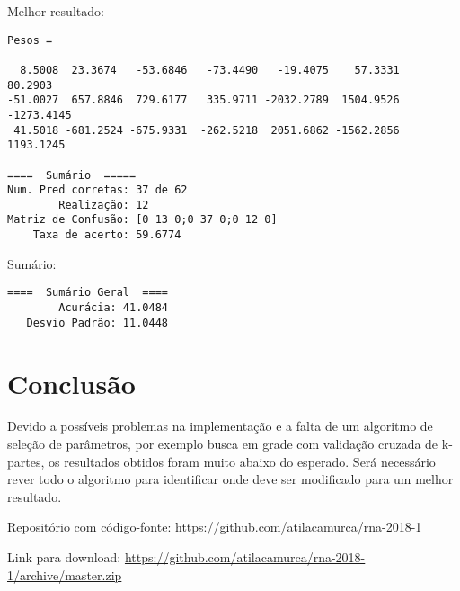 Melhor resultado:

\begin{verbatim}
Pesos =

  8.5008  23.3674   -53.6846   -73.4490   -19.4075    57.3331    80.2903
-51.0027  657.8846  729.6177   335.9711 -2032.2789  1504.9526 -1273.4145
 41.5018 -681.2524 -675.9331  -262.5218  2051.6862 -1562.2856  1193.1245

====  Sumário  =====
Num. Pred corretas: 37 de 62
        Realização: 12
Matriz de Confusão: [0 13 0;0 37 0;0 12 0]
    Taxa de acerto: 59.6774
\end{verbatim}

Sumário:

\begin{verbatim}
====  Sumário Geral  ====
        Acurácia: 41.0484
   Desvio Padrão: 11.0448
\end{verbatim}

\section{Conclusão}

Devido a possíveis problemas na implementação e a falta de um algoritmo
de seleção de parâmetros, por exemplo busca em grade com validação
cruzada de k-partes, os resultados obtidos foram muito abaixo do
esperado. Será necessário rever todo o algoritmo para identificar onde
deve ser modificado para um melhor resultado.

Repositório com código-fonte:
\url{https://github.com/atilacamurca/rna-2018-1}

Link para download:
\url{https://github.com/atilacamurca/rna-2018-1/archive/master.zip}
